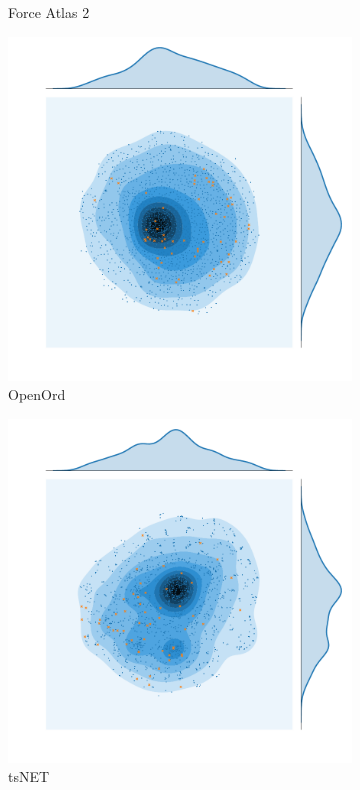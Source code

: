 \begin{figure}[H]
\begin{subfigure}[b]{.49\textwidth}
         \caption{Force Atlas 2}
         \label{fig:fa}
     \end{subfigure}
    \begin{subfigure}[b]{.49\textwidth}
         \centering \includegraphics[width=\textwidth,angle=-180]{figures_c1/layout/oo_aphh.pdf}
         \caption{OpenOrd}
         \label{fig:oo}
     \end{subfigure}
         \begin{subfigure}[b]{.49\textwidth}
         \centering \includegraphics[width=\textwidth,angle=-90]{figures_c1/layout/tsnet_aphh.pdf}
         \caption{tsNET}
         \label{fig:ts}
     \end{subfigure}
      \hfill
        \caption{ }
        \label{fig:densitycompare}
\end{figure}

